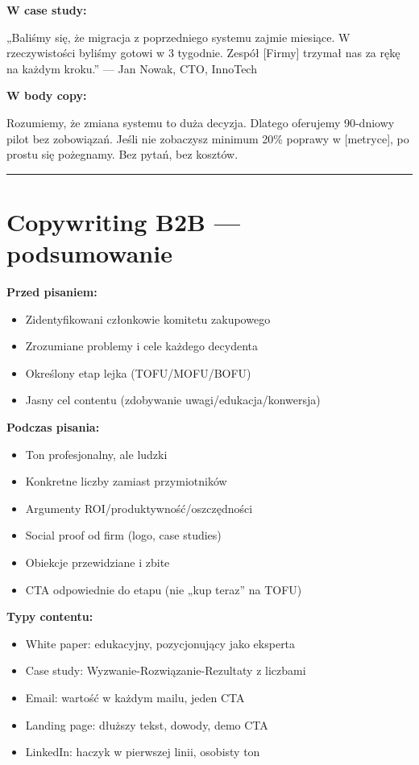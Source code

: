 \documentclass[
  12pt,
  a4paper,
  twoside,
  openright,
  12pt,
  DIV=12,
  BCOR=12mm]{scrbook}
\providecommand{\tightlist}{%
  \setlength{\itemsep}{0pt}\setlength{\parskip}{0pt}}\usepackage{longtable,booktabs,array}
\newcommand{\decoline}{%
  \begin{center}
    \textcolor{bordergray}{\rule{0.3\textwidth}{0.5pt}}
  \end{center}
}
\begin{document}
\textbf{W case study:}

„Baliśmy się, że migracja z poprzedniego systemu zajmie miesiące. W
rzeczywistości byliśmy gotowi w 3 tygodnie. Zespół {[}Firmy{]} trzymał
nas za rękę na każdym kroku.'' --- Jan Nowak, CTO, InnoTech

\textbf{W body copy:}

Rozumiemy, że zmiana systemu to duża decyzja. Dlatego oferujemy
90-dniowy pilot bez zobowiązań. Jeśli nie zobaczysz minimum 20\% poprawy
w {[}metryce{]}, po prostu się pożegnamy. Bez pytań, bez kosztów.

\decoline

\section{Copywriting B2B ---
podsumowanie}\label{copywriting-b2b-podsumowanie}

\textbf{Przed pisaniem:}

\begin{itemize}
\tightlist
\item[$\square$]
  Zidentyfikowani członkowie komitetu zakupowego
\item[$\square$]
  Zrozumiane problemy i cele każdego decydenta
\item[$\square$]
  Określony etap lejka (TOFU/MOFU/BOFU)
\item[$\square$]
  Jasny cel contentu (zdobywanie uwagi/edukacja/konwersja)
\end{itemize}

\textbf{Podczas pisania:}

\begin{itemize}
\tightlist
\item[$\square$]
  Ton profesjonalny, ale ludzki
\item[$\square$]
  Konkretne liczby zamiast przymiotników
\item[$\square$]
  Argumenty ROI/produktywność/oszczędności
\item[$\square$]
  Social proof od firm (logo, case studies)
\item[$\square$]
  Obiekcje przewidziane i zbite
\item[$\square$]
  CTA odpowiednie do etapu (nie „kup teraz'' na TOFU)
\end{itemize}

\textbf{Typy contentu:}

\begin{itemize}
\tightlist
\item[$\square$]
  White paper: edukacyjny, pozycjonujący jako eksperta
\item[$\square$]
  Case study: Wyzwanie-Rozwiązanie-Rezultaty z liczbami
\item[$\square$]
  Email: wartość w każdym mailu, jeden CTA
\item[$\square$]
  Landing page: dłuższy tekst, dowody, demo CTA
\item[$\square$]
  LinkedIn: haczyk w pierwszej linii, osobisty ton
\end{itemize}
\end{document}
